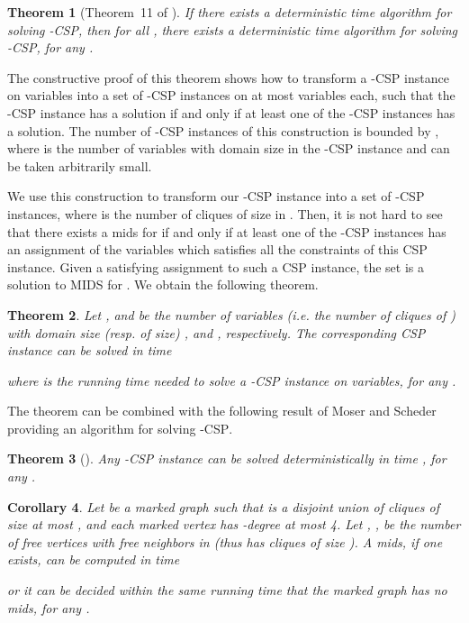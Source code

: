 \documentclass[a4paper,10pt]{article}
\theoremstyle{plain}
\newtheorem{theorem}{Theorem}
\newtheorem{corollary}[theorem]{Corollary}
\theoremstyle{definition}
\theoremstyle{remark}
\newcommand{\MIDSpb}{\textsc{MIDS}\xspace}
\newcommand{\mids}{mids\xspace}
\newcommand{\CSPpb}{\textsc{CSP}\xspace}
\begin{document}
\begin{theorem}[Theorem~11 of \cite{Angelsmark05}]
If there exists a deterministic  time algorithm for
solving -\CSPpb, then for all , there exists a deterministic
 time algorithm for solving
-\CSPpb, for any .
\end{theorem}

The constructive proof of this theorem
shows how to transform a -\CSPpb instance on  variables into a set of
-\CSPpb instances on at most  variables each, such that the -\CSPpb instance has a solution
if and only if at least one of the -\CSPpb instances has a solution. The number
of -\CSPpb instances of this construction is bounded by ,
where  is the number of variables with domain size  in the -\CSPpb instance and  can
be taken arbitrarily small.

We use this construction to transform our -\CSPpb instance into a set of 
-\CSPpb instances, where  is the number of cliques of size  in .
Then, it is not hard to see that
there exists a \mids for  if and only if at least one of the -\CSPpb instances has
an assignment of the variables which satisfies all the constraints of this \CSPpb instance.
Given a satisfying assignment  to such a \CSPpb instance,
the set 
is a solution to \MIDSpb for .
We obtain the following theorem.



\begin{theorem}
Let ,  and  be the number of variables (i.e. the number of cliques of )
with domain size (resp. of size) ,  and , respectively.
The corresponding \CSPpb instance can be solved in time

where  is the running time needed to solve a -\CSPpb instance on  variables,
for any .
\end{theorem}

The theorem can be combined with the following result of Moser and Scheder \cite{MoserS10}
providing an algorithm for solving -\CSPpb.



\begin{theorem}[\cite{MoserS10}]\label{thm:MoserS10}
Any -\CSPpb instance can be solved deterministically in time , for any .
\end{theorem}

\begin{corollary}\label{cor:csp}
Let  be a marked graph such that
 is a disjoint union of cliques
of size at most , and each marked vertex has -degree at most 4.
Let , , be the number of free vertices with  free neighbors in 
(thus  has  cliques of size ).
A \mids, if one exists, can be computed in time

or it can be decided within the same running time that the marked graph has no \mids, for
any .
\end{corollary}
\end{document}
